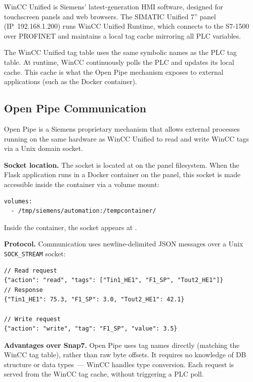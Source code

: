 WinCC Unified is Siemens' latest-generation HMI software, designed for touchscreen panels
and web browsers. The SIMATIC Unified 7\textquotedblright{} panel (IP~192.168.1.200) runs
WinCC Unified Runtime, which connects to the S7-1500 over PROFINET and maintains a local
tag cache mirroring all PLC variables.

The WinCC Unified tag table uses the same symbolic names as the PLC tag table. At runtime,
WinCC continuously polls the PLC and updates its local cache. This cache is what the
Open Pipe mechanism exposes to external applications (such as the Docker container).

\subsection{Open Pipe Communication}
\label{sec:openpipe}

Open Pipe is a Siemens proprietary mechanism that allows external processes running on the
same hardware as WinCC Unified to read and write WinCC tags via a Unix domain socket.

\textbf{Socket location.}
The socket is located at  on the panel
filesystem. When the Flask application runs in a Docker container on the panel, this socket
is made accessible inside the container via a volume mount:

\begin{lstlisting}[style=yaml, caption={Docker volume mount for Open Pipe access.}]
volumes:
  - /tmp/siemens/automation:/tempcontainer/
\end{lstlisting}

Inside the container, the socket appears at .

\textbf{Protocol.}
Communication uses newline-delimited JSON messages over a Unix \texttt{SOCK\_STREAM} socket:

\begin{lstlisting}[style=json,
  caption={Open Pipe read/write request--response format.},
  label={lst:openpipe}]
// Read request
{"action": "read", "tags": ["Tin1_HE1", "F1_SP", "Tout2_HE1"]}
// Response
{"Tin1_HE1": 75.3, "F1_SP": 3.0, "Tout2_HE1": 42.1}

// Write request
{"action": "write", "tag": "F1_SP", "value": 3.5}
\end{lstlisting}

\textbf{Advantages over Snap7.}
Open Pipe uses tag names directly (matching the WinCC tag table), rather than raw byte
offsets. It requires no knowledge of DB structure or data types~--- WinCC handles type
conversion. Each request is served from the WinCC tag cache, without triggering a PLC poll.

